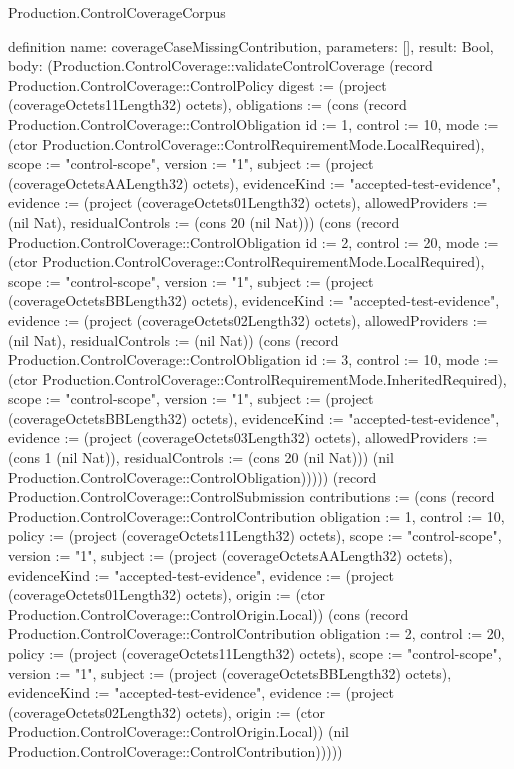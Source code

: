 \begin{lexlean}{Production.ControlCoverageCorpus}
\begin{semanticmodule}
definition{
  name: coverageCaseMissingContribution,
  parameters: [],
  result: Bool,
  body: (Production.ControlCoverage::validateControlCoverage (record Production.ControlCoverage::ControlPolicy {digest := (project (coverageOctets11Length32) octets), obligations := (cons (record Production.ControlCoverage::ControlObligation {id := 1, control := 10, mode := (ctor Production.ControlCoverage::ControlRequirementMode.LocalRequired), scope := "control-scope", version := "1", subject := (project (coverageOctetsAALength32) octets), evidenceKind := "accepted-test-evidence", evidence := (project (coverageOctets01Length32) octets), allowedProviders := (nil Nat), residualControls := (cons 20 (nil Nat))}) (cons (record Production.ControlCoverage::ControlObligation {id := 2, control := 20, mode := (ctor Production.ControlCoverage::ControlRequirementMode.LocalRequired), scope := "control-scope", version := "1", subject := (project (coverageOctetsBBLength32) octets), evidenceKind := "accepted-test-evidence", evidence := (project (coverageOctets02Length32) octets), allowedProviders := (nil Nat), residualControls := (nil Nat)}) (cons (record Production.ControlCoverage::ControlObligation {id := 3, control := 10, mode := (ctor Production.ControlCoverage::ControlRequirementMode.InheritedRequired), scope := "control-scope", version := "1", subject := (project (coverageOctetsBBLength32) octets), evidenceKind := "accepted-test-evidence", evidence := (project (coverageOctets03Length32) octets), allowedProviders := (cons 1 (nil Nat)), residualControls := (cons 20 (nil Nat))}) (nil Production.ControlCoverage::ControlObligation))))}) (record Production.ControlCoverage::ControlSubmission {contributions := (cons (record Production.ControlCoverage::ControlContribution {obligation := 1, control := 10, policy := (project (coverageOctets11Length32) octets), scope := "control-scope", version := "1", subject := (project (coverageOctetsAALength32) octets), evidenceKind := "accepted-test-evidence", evidence := (project (coverageOctets01Length32) octets), origin := (ctor Production.ControlCoverage::ControlOrigin.Local)}) (cons (record Production.ControlCoverage::ControlContribution {obligation := 2, control := 20, policy := (project (coverageOctets11Length32) octets), scope := "control-scope", version := "1", subject := (project (coverageOctetsBBLength32) octets), evidenceKind := "accepted-test-evidence", evidence := (project (coverageOctets02Length32) octets), origin := (ctor Production.ControlCoverage::ControlOrigin.Local)}) (nil Production.ControlCoverage::ControlContribution)))}))
}


\end{semanticmodule}
\end{lexlean}
